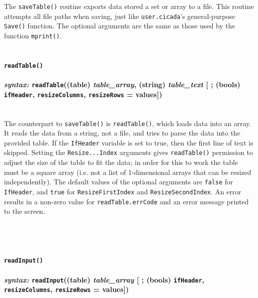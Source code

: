 \documentclass{article}
\begin{document}
The \texttt{saveTable()} routine exports data stored a set or array to a file.  This routine attempts all file paths when saving, just like \verb#user.cicada#'s general-purpose \verb#Save()# function.  The optional arguments are the same as those used by the function \texttt{mprint()}.\\\\



\paragraph{\texttt{readTable()}\\\\
\normalfont \emph{syntax: } \texttt{readTable}((table) \emph{table\_array}, (string) \emph{table\_text} [ ; (bools) \texttt{ifHeader}, \texttt{resizeColumns}, \texttt{resizeRows} = values])\\\\}

The counterpart to \texttt{saveTable()} is \texttt{readTable()}, which loads data into an array.  It reads the data from a string, not a file, and tries to parse the data into the provided table.  If the \texttt{IfHeader} variable is set to true, then the first line of text is skipped.  Setting the \texttt{Resize...Index} arguments gives \verb#readTable()# permission to adjust the size of the table to fit the data; in order for this to work the table must be a square array (i.e. not a list of 1-dimensional arrays that can be resized independently).  The default values of the optional arguments are \texttt{false} for \texttt{IfHeader}, and \texttt{true} for \texttt{ResizeFirstIndex} and \texttt{ResizeSecondIndex}.  An error results in a non-zero value for \verb#readTable.errCode# and an error message printed to the screen.\\\\\\\\



\paragraph{\texttt{readInput()}\\\\
\normalfont \emph{syntax: } \texttt{readInput}((table) \emph{table\_array} [ ; (bools) \texttt{ifHeader}, \texttt{resizeColumns}, \texttt{resizeRows} = values])\\\\}
\end{document}
